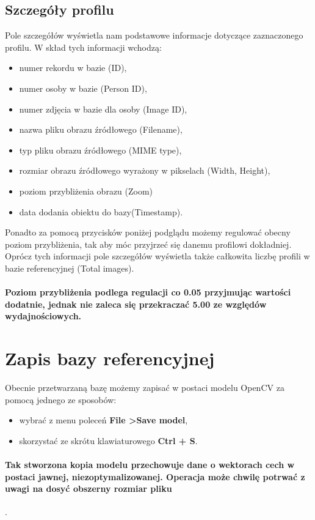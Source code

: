 \documentclass[]{article}
\begin{document}
\subsection{Szczegóły profilu}
Pole szczegółów wyświetla nam podstawowe informacje dotyczące zaznaczonego profilu. W skład tych informacji wchodzą:
\begin{itemize}
	\item numer rekordu w bazie (ID),
	\item numer osoby w bazie (Person ID),
	\item numer zdjęcia w bazie dla osoby (Image ID),
	\item nazwa pliku obrazu źródłowego (Filename),
	\item typ pliku obrazu źródłowego (MIME type),
	\item rozmiar obrazu źródłowego wyrażony w pikselach (Width, Height),
	\item poziom przybliżenia obrazu (Zoom)
	\item data dodania obiektu do bazy(Timestamp).
\end{itemize}
Ponadto za pomocą przycisków poniżej podglądu możemy regulować obecny poziom przybliżenia, tak aby móc przyjrzeć się danemu profilowi dokładniej.
\newline
Oprócz tych informacji pole szczegółów wyświetla także całkowita liczbę profili w bazie referencyjnej (Total images).
\paragraph*{Poziom przybliżenia podlega regulacji co 0.05 przyjmując wartości dodatnie, jednak nie zaleca się przekraczać 5.00 ze względów wydajnościowych.}

\section[Zapisywanie bazy]{Zapis bazy referencyjnej}
\label{sec:save}
Obecnie przetwarzaną bazę możemy zapisać w postaci modelu OpenCV za pomocą jednego ze sposobów:
\begin{itemize}
	\item wybrać z menu poleceń \textbf{File \textgreater \space Save model},
	\item skorzystać ze skrótu klawiaturowego \textbf{Ctrl + S}.
\end{itemize}

\paragraph*{Tak stworzona kopia modelu przechowuje dane o wektorach cech w postaci jawnej, niezoptymalizowanej. Operacja może chwilę potrwać z uwagi na dosyć obszerny rozmiar pliku}.
\end{document}
